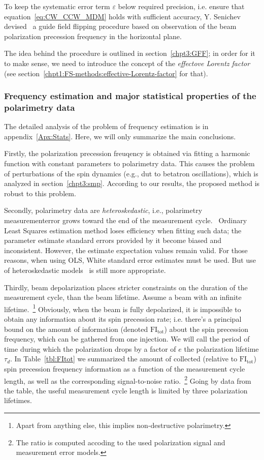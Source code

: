 To keep the systematic error term $\varepsilon$ below required precision, i.e. ensure
that equation~\eqref{eq:CW_CCW_MDM} holds with sufficient accuracy, Y. Senichev 
devised~\cite{Senichev:FDM} a guide field flipping procedure
based on observation of the beam polarization precession frequency in the horizontal plane.

The idea behind the procedure is outlined in section~\ref{chpt3:GFF}; in order for it to make sense, we need
to introduce the concept of the \emph{effectove Lorentz factor}
(see section~\ref{chpt1:FS-methods:effective-Lorentz-factor} for that).

\subsubsection{Frequency estimation and major statistical properties of the polarimetry data}
The detailed analysis of the problem of frequency estimation is in appendix~\ref{Apx:Stats}. Here, we will
only summarize the main conclusions.

Firstly, the polarization precession freuqency is obtained via fitting a harmonic function with constant parameters to polarimetry data. This causes the problem of perturbations of the spin dynamics (e.g.,
dut to betatron oscillations), which is analyzed in section~\ref{chpt3:smp}. According to our results,
the proposed method is robust to this problem.

Secondly, polarimetry data are \emph{heteroskedastic}, i.e., polarimetry measurementerror grows
toward the end of the measurement cycle.~\cite{Eversmann:Thesis} Ordinary Least Squares estimation method
loses efficiency when fitting such data; the parameter estimate standard errors provided by it
become biased and inconsistent. However, the estimate expectation values remain valid. For those reasons, when
using OLS, White standard error estimates must be used.
But use of heteroskedastic models~\cite{Stats:R:NLREG, Stats:HeteroskedasticNRM} is still more appropriate.

Thirdly, beam depolarization places stricter constraints on the duration of the measurement cycle, than
the beam lifetime. Assume a beam with an infinite lifetime.~\footnote{Apart from anything else,
  this implies non-destructive polarimetry.} Obviously, when the beam is fully depolarized, it is impossible to
obtain any information about its spin precession rate; i.e. there's a principal bound on the amount of information
(denoted $\mathrm{FI_{tot}}$) about the spin precession frequency, which can be gathered from one injection.
We will call the period of time during which the polarization drops by a factor of $e$
the polarization lifetime $\tau_d$. In Table~\ref{tbl:FItot} we summarized the amount of collected
(relative to $\mathrm{FI_{tot}}$) spin precession frequency information as a function of the measurement cycle
length, as well as the corresponding signal-to-noise ratio.~\footnote{The ratio is computed accoding to
  the used polarization signal and measurement error models.} Going by data from the table, the useful
measurement cycle length is limited by three polarization lifetimes.

